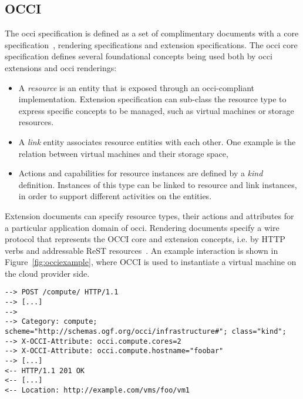\documentclass[twocolumn]{svjour3}       %
\begin{document}


\subsection{OCCI}

The \gls{occi} specification is defined as a set of complimentary documents with a core specification~\cite{citemaster_9270}, rendering specifications and extension specifications. The \gls{occi} core specification defines several foundational concepts being used both by \gls{occi} extensions and \gls{occi} renderings:

\begin{itemize}
\item A \emph{resource} is an entity that is exposed through an \gls{occi}-compliant implementation. Extension specification can sub-class the resource type to express specific concepts to be managed, such as virtual machines or storage resources.
\item A \emph{link} entity associates resource entities with each other. One example is the relation between virtual machines and their storage space,
\item Actions and capabilities for resource instances are defined by a \emph{kind} definition. Instances of this type can be linked to resource and link instances, in order to support different activities on the entities.
\end{itemize}

Extension documents can specify resource types, their actions and attributes for a particular application domain of \gls{occi}. Rendering documents specify a wire protocol that represents the OCCI core and extension concepts, i.e. by HTTP verbs and addressable ReST resources~\cite{gfd185}. An example interaction is shown in Figure~\ref{fig:occiexample}, where OCCI is used to instantiate a virtual machine on the cloud provider side.

\begin{figure*}
\begin{lstlisting}
--> POST /compute/ HTTP/1.1 
--> [...] 
--> 
--> Category: compute; scheme="http://schemas.ogf.org/occi/infrastructure#"; class="kind"; 
--> X-OCCI-Attribute: occi.compute.cores=2
--> X-OCCI-Attribute: occi.compute.hostname="foobar" 
--> [...]
<-- HTTP/1.1 201 OK 
<-- [...] 
<-- Location: http://example.com/vms/foo/vm1
\end{lstlisting}
\caption{Example: Creating a virtual machine instance}
\label{fig:occiexample} 
\end{figure*}
\end{document}
